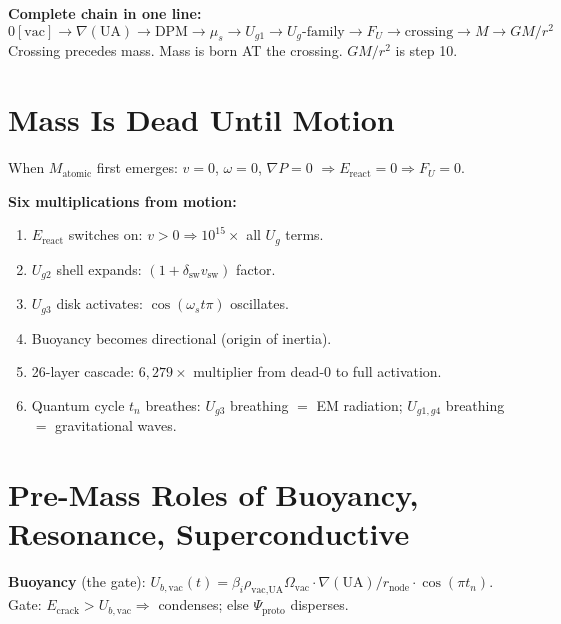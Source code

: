 \documentclass[12pt,a4paper]{article}
\begin{document}
\noindent\textbf{Complete chain in one line:}
\begin{equation*}
0[\text{vac}] \to \nabla(\text{UA}) \to \text{DPM} \to \mu_s \to U_{g1} \to
U_g\text{-family} \to F_U \to \text{crossing} \to M \to GM/r^2
\end{equation*}
Crossing precedes mass.  Mass is born AT the crossing.  $GM/r^2$ is step 10.

\section{Mass Is Dead Until Motion}
\label{sec:dead_mass}

When $M_{\text{atomic}}$ first emerges: $v = 0$, $\omega = 0$, $\nabla P = 0$
$\Rightarrow E_{\text{react}} = 0 \Rightarrow F_U = 0$.

\noindent\textbf{Six multiplications from motion:}
\begin{enumerate}[noitemsep]
  \item $E_{\text{react}}$ switches on: $v>0 \Rightarrow 10^{15}\times$ all $U_g$ terms.
  \item $U_{g2}$ shell expands: $(1+\delta_{\text{sw}}v_{\text{sw}})$ factor.
  \item $U_{g3}$ disk activates: $\cos(\omega_s t \pi)$ oscillates.
  \item Buoyancy becomes directional (origin of inertia).
  \item 26-layer cascade: $6{,}279\times$ multiplier from dead-0 to full activation.
  \item Quantum cycle $t_n$ breathes: $U_{g3}$ breathing $=$ EM radiation;
    $U_{g1,g4}$ breathing $=$ gravitational waves.
\end{enumerate}

\section{Pre-Mass Roles of Buoyancy, Resonance, Superconductive}
\label{sec:premass}

\noindent\textbf{Buoyancy} (the gate):
$U_{b,\text{vac}}(t) = \beta_i \rho_{\text{vac,UA}} \Omega_{\text{vac}}
  \cdot \nabla(\text{UA})/r_{\text{node}} \cdot \cos(\pi t_n)$.
Gate: $E_{\text{crack}} > U_{b,\text{vac}} \Rightarrow$ condenses;
else $\Psi_{\text{proto}}$ disperses.
\end{document}
